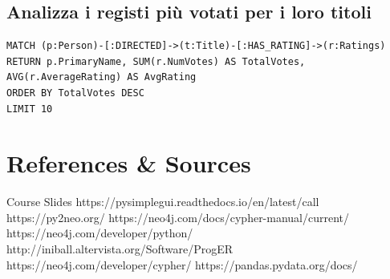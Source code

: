 \documentclass[a4paper,12pt]{article}
\begin{document}
\subsection{Analizza i registi più votati per i loro titoli}
\begin{verbatim}
MATCH (p:Person)-[:DIRECTED]->(t:Title)-[:HAS_RATING]->(r:Ratings)
RETURN p.PrimaryName, SUM(r.NumVotes) AS TotalVotes, AVG(r.AverageRating) AS AvgRating
ORDER BY TotalVotes DESC
LIMIT 10
\end{verbatim}




\newpage
\section{References \& Sources}
  \begin{thebibliography}{9}
    \bibitem{} Course Slides
    \bibitem{} https://pysimplegui.readthedocs.io/en/latest/call%
    \bibitem{} https://py2neo.org/
    \bibitem{} https://neo4j.com/docs/cypher-manual/current/
    \bibitem{} https://neo4j.com/developer/python/
    \bibitem{} http://iniball.altervista.org/Software/ProgER
    \bibitem{} https://neo4j.com/developer/cypher/
    \bibitem{} https://pandas.pydata.org/docs/
  \end{thebibliography}
\end{document}
